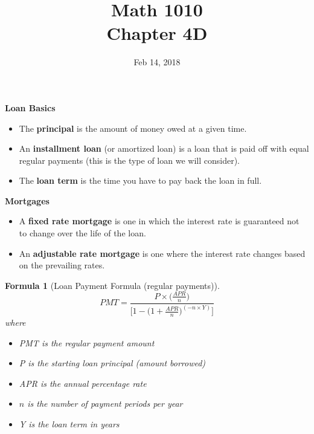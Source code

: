 \documentclass[12pt]{article}
\newtheorem{formula}[theorem]{Formula}
\begin{document}
\title{\bf Math 1010 \\ Chapter 4D\iftoggle{sol}{ Key}{} }
\date{Feb 14, 2018}
\maketitle

{\large \bf Loan Basics}
\begin{itemize}
	\item The {\bf principal} is the amount of money owed at a given time.
	\item An {\bf installment loan} (or amortized loan) is a loan that is paid off with equal regular payments (this is the type of loan we will consider).
	\item The {\bf loan term} is the time you have to pay back the loan in full.
\end{itemize}

{\large \bf Mortgages}
\begin{itemize}
	\item A {\bf fixed rate mortgage} is one in which the interest rate is guaranteed not to change over the life of the loan.
	\item An {\bf adjustable rate mortgage} is one where the interest rate changes based on the prevailing rates.
\end{itemize}

\begin{formula}[Loan Payment Formula (regular payments)]
\begin{equation}\label{eq:loan_formula}
	PMT = \frac{P\times \Big(\frac{APR}{n} \Big)}{\Big[1 - \Big(1 + \frac{APR}{n}\Big)^{(-n\times Y)}\Big]}
\end{equation}
where
\begin{itemize}
	\item PMT is the regular payment amount
	\item P is the starting loan principal (amount borrowed)
	\item APR is the annual percentage rate
	\item $n$ is the number of payment periods per year
	\item Y is the loan term in years
\end{itemize}

\end{formula}
\end{document}
